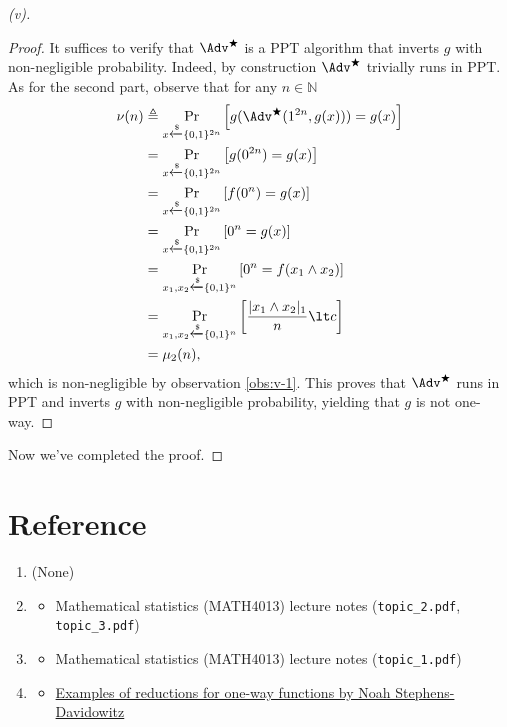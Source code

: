 \begin{proof}[(v)]
\begin{proof}
        It suffices to verify that $\Adv^\bigstar$ is a PPT algorithm that inverts $g$ with non-negligible probability. Indeed, by construction $\Adv^\bigstar$ trivially runs in PPT. As for the second part, observe that for any $n\in\mathbb{N}$
        \begin{align*}
            \nu(n)&\triangleq \Pr_{x\xleftarrow{\$}\{0,1\}^{2n}}\left[g(\Adv^\bigstar(1^{2n}, g(x))) = g(x)\right]\\
            &= \Pr_{x\xleftarrow{\$}\{0,1\}^{2n}}\left[g(0^{2n})=g(x)\right]\\
            &= \Pr_{x\xleftarrow{\$}\{0,1\}^{2n}}\left[ f(0^{n})=g(x)\right]\\
            &= \Pr_{x\xleftarrow{\$}\{0,1\}^{2n}}\left[0^{n}=g(x)\right]\\
            &= \Pr_{x_1,x_2\xleftarrow{\$}\{0,1\}^{n}}\left[0^n= f(x_1\land x_2)\right]\\
            &= \Pr_{x_1,x_2\xleftarrow{\$}\{0,1\}^{n}}\left[\frac{|x_1\land x_2|_1}{n}\lt c\right]\\
            &= \mu_2(n),
        \end{align*}
        which is non-negligible by observation \ref{obs:v-1}. This proves that $\Adv^\bigstar$ runs in PPT and inverts $g$ with non-negligible probability, yielding that $g$ is not one-way.
    \end{proof}
    Now we've completed the proof.
\end{proof}


\clearpage
\section*{Reference}
\begin{enumerate}
    \item[P1] (None)
    \item[P2]
        \begin{itemize}
            \item Mathematical statistics (MATH4013) lecture notes (\texttt{topic\_2.pdf}, \texttt{topic\_3.pdf})
        \end{itemize}
    \item[P3]
        \begin{itemize}
            \item Mathematical statistics (MATH4013) lecture notes (\texttt{topic\_1.pdf})
        \end{itemize}
    \item[P4]
        \begin{itemize}
            \item \href{https://www.noahsd.com/crypto_lecture_notes/CS4830_Supplementary_Notes___Examples_of_reductions.pdf}{Examples of reductions for one-way functions by Noah Stephens-Davidowitz}
        \end{itemize}
\end{enumerate}
